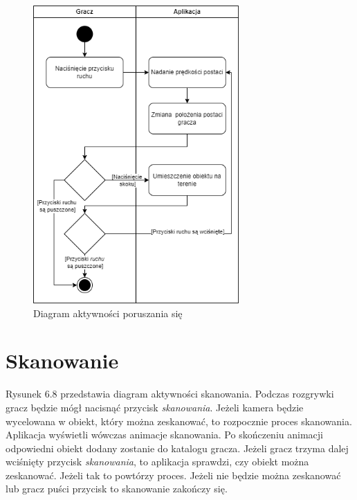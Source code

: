 \begin{figure}[H]
    \centering
        \includegraphics[width=0.7\textwidth]{Graphics/activities/move.png}
         \caption{Diagram aktywności poruszania się}
\end{figure}

\clearpage

\section{Skanowanie}

Rysunek 6.8 przedstawia diagram aktywności skanowania.
Podczas rozgrywki gracz będzie mógł nacisnąć przycisk \textit{skanowania}. Jeżeli kamera będzie wycelowana w obiekt, który można zeskanować, to rozpocznie proces skanowania. Aplikacja wyświetli wówczas animacje skanowania. Po skończeniu animacji odpowiedni obiekt dodany zostanie do katalogu gracza. Jeżeli gracz trzyma dalej wciśnięty przycisk \textit{skanowania}, to aplikacja sprawdzi, czy obiekt można zeskanować. Jeżeli tak to powtórzy proces. Jeżeli nie będzie można zeskanować lub gracz puści przycisk to skanowanie zakończy się.

